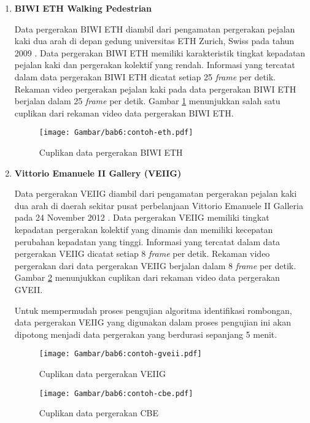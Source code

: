 \begin{enumerate}
    \item \textbf{BIWI ETH Walking Pedestrian}
    
    Data pergerakan BIWI ETH diambil dari pengamatan pergerakan pejalan kaki dua arah di depan gedung universitas ETH Zurich, Swiss pada tahun 2009 \cite{pellegrini:eth}. Data pergerakan BIWI ETH memiliki karakteristik tingkat kepadatan pejalan kaki dan pergerakan kolektif yang rendah. Informasi yang tercatat dalam data pergerakan BIWI ETH dicatat setiap 2\.5 \textit{frame} per detik. Rekaman video pergerakan pejalan kaki pada data pergerakan BIWI ETH berjalan dalam 25 \textit{frame} per detik. Gambar \ref{bab6:contoh-eth} menunjukkan salah satu cuplikan dari rekaman video data pergerakan BIWI ETH.
    
    \begin{figure}[b!]
        \centering
        \texttt{[image: Gambar/bab6:contoh-eth.pdf]}
        \caption{Cuplikan data pergerakan BIWI ETH}
        \label{bab6:contoh-eth}
    \end{figure}
    
    \item \textbf{Vittorio Emanuele II Gallery (VEIIG)}
    
    Data pergerakan VEIIG diambil dari pengamatan pergerakan pejalan kaki dua arah di daerah sekitar pusat perbelanjaan Vittorio Emanuele II Galleria pada 24 November 2012 \cite{bandini:gveii}. Data pergerakan VEIIG memiliki tingkat kepadatan pergerakan kolektif yang dinamis dan memiliki kecepatan perubahan kepadatan yang tinggi. Informasi yang tercatat dalam data pergerakan VEIIG dicatat setiap 8 \textit{frame} per detik. Rekaman video pergerakan dari data pergerakan VEIIG berjalan dalam 8 \textit{frame} per detik. Gambar \ref{bab6:contoh-gveii} menunjukkan cuplikan dari rekaman video data pergerakan GVEII.
    
    Untuk mempermudah proses pengujian algoritma identifikasi rombongan, data pergerakan VEIIG yang digunakan dalam proses pengujian ini akan dipotong menjadi data pergerakan yang berdurasi sepanjang 5 menit.
    
    \begin{figure}[h]
        \centering
        \texttt{[image: Gambar/bab6:contoh-gveii.pdf]}
        \caption{Cuplikan data pergerakan VEIIG}
        \label{bab6:contoh-gveii}
    \end{figure}
    
    \begin{figure}[b!]
        \centering
        \texttt{[image: Gambar/bab6:contoh-cbe.pdf]}
        \caption{Cuplikan data pergerakan CBE}
        \label{bab6:contoh-cbe}
    \end{figure}
    

\end{enumerate}
